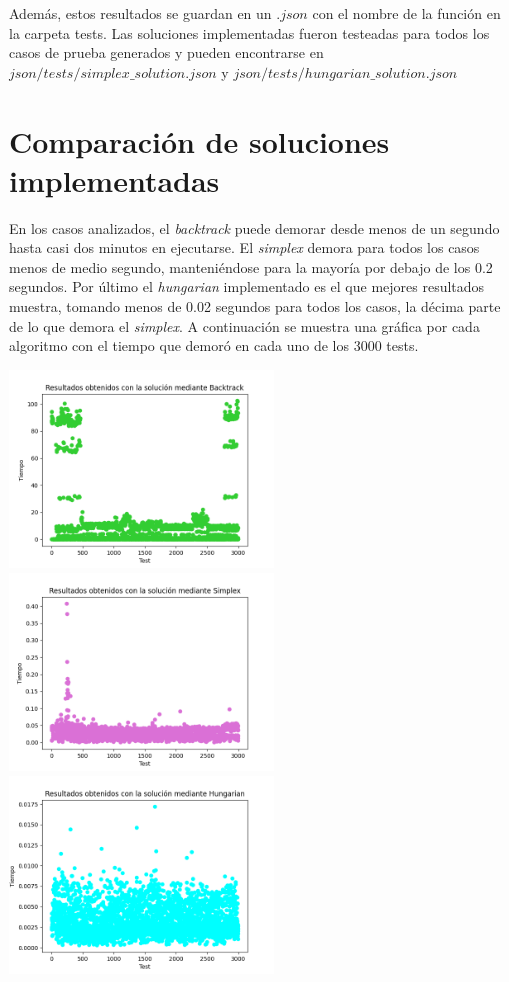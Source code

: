 \documentclass[10pt]{article} %
\begin{document}
 	 Adem\'as, estos resultados se guardan en un $ .json $ con el nombre de la funci\'on en la carpeta tests. Las soluciones implementadas fueron testeadas para todos los casos de prueba generados y pueden encontrarse en $ json/tests/simplex\_solution.json $ y $ json/tests/hungarian\_solution.json $
	
	\section{Comparaci\'on de soluciones implementadas}
	
	En los casos analizados, el \textit{backtrack} puede demorar desde menos de un segundo hasta casi dos minutos en ejecutarse. El \textit{simplex} demora para todos los casos menos de medio segundo, manteni\'endose para la mayor\'ia por debajo de los 0.2 segundos. Por \'ultimo el \textit{hungarian} implementado es el que mejores resultados muestra, tomando menos de 0.02 segundos para todos los casos, la d\'ecima parte de lo que demora el \textit{simplex}. A continuaci\'on se muestra una gr\'afica por cada algoritmo con el tiempo que demor\'o en cada uno de los 3000 tests. 
	\begin{center}
		\includegraphics[width=7cm]{Backtrack_results.png}\\
		\includegraphics[width=7cm]{Simplex_results.png}
		\includegraphics[width=7cm]{Hungarian_results.png}
	\end{center}  
	
\end{document}
